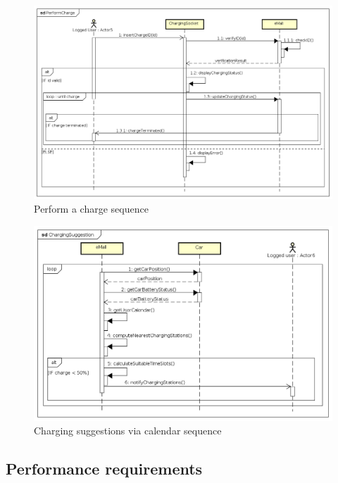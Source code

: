 \begin{figure}[!h]
    \begin{center}
        \includegraphics[keepaspectratio, width=16cm]{Sequence/PerformCharge.png}
        \caption{Perform a charge sequence}
    \end{center}
\end{figure}
\begin{figure}[!h]
    \begin{center}
        \includegraphics[keepaspectratio, width=16cm]{Sequence/ChargingSuggestion.png}
        \caption{Charging suggestions via calendar sequence}
    \end{center}
\end{figure}

\clearpage
\subsection{Performance requirements}

